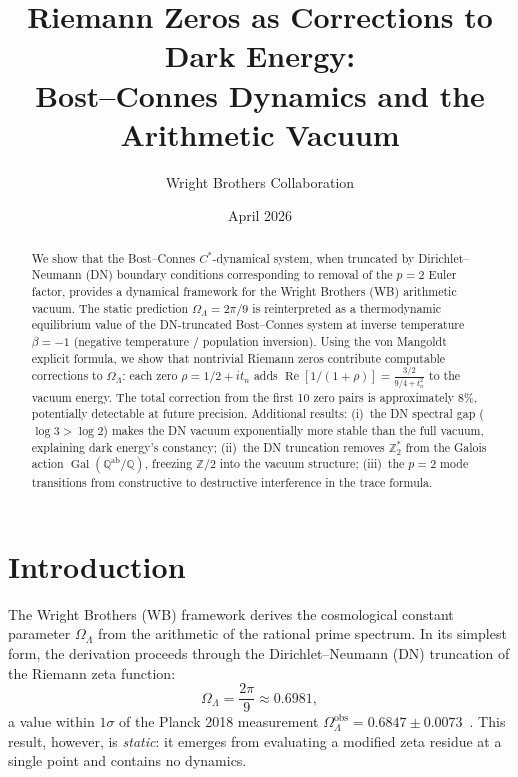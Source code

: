 \documentclass[12pt,a4paper]{article}
\title{Riemann Zeros as Corrections to Dark Energy:\\
Bost--Connes Dynamics and the Arithmetic Vacuum}
\author{Wright Brothers Collaboration}
\date{April 2026}
\newcommand{\Gal}{\operatorname{Gal}}
\newcommand{\OL}{\Omega_\Lambda}
\newcommand{\Qab}{\mathbb{Q}^{\mathrm{ab}}}
\begin{document}
\maketitle

\begin{abstract}
We show that the Bost--Connes $C^*$-dynamical system, when truncated by Dirichlet--Neumann (DN) boundary conditions corresponding to removal of the $p=2$ Euler factor, provides a dynamical framework for the Wright Brothers (WB) arithmetic vacuum. The static prediction $\OL = 2\pi/9$ is reinterpreted as a thermodynamic equilibrium value of the DN-truncated Bost--Connes system at inverse temperature $\beta = -1$ (negative temperature / population inversion). Using the von Mangoldt explicit formula, we show that nontrivial Riemann zeros contribute computable corrections to $\OL$: each zero $\rho = 1/2 + it_n$ adds $\operatorname{Re}[1/(1+\rho)] = \frac{3/2}{9/4 + t_n^2}$ to the vacuum energy. The total correction from the first 10 zero pairs is approximately $8\%$, potentially detectable at future precision. Additional results: (i)~the DN spectral gap ($\log 3 > \log 2$) makes the DN vacuum exponentially more stable than the full vacuum, explaining dark energy's constancy; (ii)~the DN truncation removes $\mathbb{Z}_2^*$ from the Galois action $\Gal(\Qab/\mathbb{Q})$, freezing $\mathbb{Z}/2$ into the vacuum structure; (iii)~the $p=2$ mode transitions from constructive to destructive interference in the trace formula.
\end{abstract}

\tableofcontents

\section{Introduction}
\label{sec:intro}

The Wright Brothers (WB) framework derives the cosmological constant parameter $\OL$ from the arithmetic of the rational prime spectrum. In its simplest form, the derivation proceeds through the Dirichlet--Neumann (DN) truncation of the Riemann zeta function:
\begin{equation}\label{eq:OL-static}
  \OL = \frac{2\pi}{9} \approx 0.6981,
\end{equation}
a value within $1\sigma$ of the Planck 2018 measurement $\OL^{\mathrm{obs}} = 0.6847 \pm 0.0073$~\cite{Planck2018}. This result, however, is \emph{static}: it emerges from evaluating a modified zeta residue at a single point and contains no dynamics.
\end{document}
